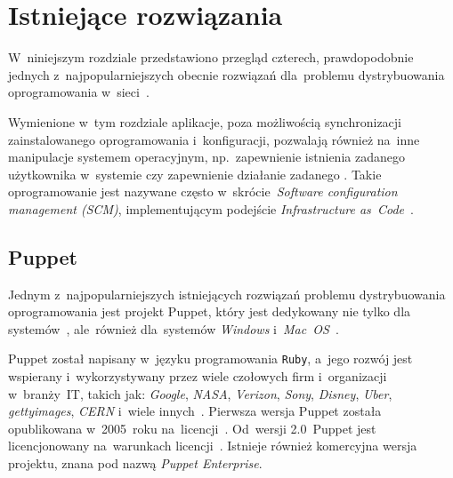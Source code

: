 \documentclass[thesis]{subfiles}
\begin{document}

\section{Istniejące rozwiązania}
\label{sec:istniejace-rozwiazania}

W~niniejszym rozdziale przedstawiono przegląd czterech, prawdopodobnie jednych z~najpopularniejszych obecnie rozwiązań dla~problemu dystrybuowania oprogramowania w~sieci~\cite{leading-scms,wiki:scm-comparison}.

Wymienione w~tym rozdziale aplikacje, poza możliwością synchronizacji zainstalowanego oprogramowania i~konfiguracji, pozwalają również na~inne manipulacje systemem operacyjnym, np.~zapewnienie istnienia zadanego użytkownika w~systemie czy zapewnienie działanie zadanego . Takie oprogramowanie jest nazywane często w~skrócie~\emph{Software configuration management (SCM)}, implementującym podejście \emph{Infrastructure as~Code}~\cite{wiki:iac,wiki:scm}.


\subsection{Puppet}

Jednym z~najpopularniejszych istniejących rozwiązań problemu dystrybuowania oprogramowania jest projekt Puppet, który jest dedykowany nie tylko dla systemów~, ale~również dla~systemów \emph{Windows} i~\emph{Mac~OS}~\cite{puppet,puppet-github,puppet-clients}.

Puppet został napisany w~języku programowania \texttt{Ruby}, a~jego rozwój jest wspierany i~wykorzystywany przez wiele czołowych firm i~organizacji w~branży~IT, takich jak: \emph{Google}, \emph{NASA}, \emph{Verizon}, \emph{Sony}, \emph{Disney}, \emph{Uber}, \emph{gettyimages}, \emph{CERN} i~wiele innych~\cite{puppet,puppet-google,puppet-cern,puppet-chef-disney}. Pierwsza wersja Puppet została opublikowana w~2005~roku na~licencji~. Od~wersji 2.0~Puppet jest licencjonowany na~warunkach licencji~. Istnieje również komercyjna wersja projektu, znana pod nazwą \emph{Puppet Enterprise}.
\end{document}
